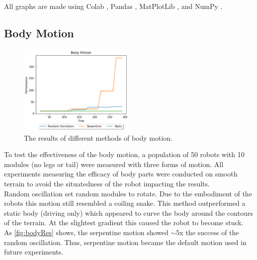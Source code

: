 \documentclass{article}
\begin{document}
All graphs are made using Colab \citep{colab}, Pandas \citep{pd}, MatPlotLib \citep{plt}, and NumPy \citep{np}.

\subsection{Body Motion}
\label{sec:Body Res}
\begin{figure}
    \centering
    \vspace*{-5mm}
    \includegraphics[width=0.5\textwidth]{bodyResults}
    \vspace*{-7mm}
    \caption{The results of different methods of body motion.}
    \label{fig:bodyRes}
\end{figure}
To test the effectiveness of the body motion, a population of 50 robots with 10 modules (no legs or tail) were measured with three forms of motion. All experiments measuring the efficacy of body parts were conducted on smooth terrain to avoid the situatedness of the robot impacting the results.\\
Random oscillation set random modules to rotate. Due to the embodiment of the robots this motion still resembled a coiling snake. This method outperformed a static body (driving only) which appeared to curve the body around the contours of the terrain. At the slightest gradient this caused the robot to become stuck. \\
As \autoref{fig:bodyRes} shows, the serpentine motion showed $\sim$5x the success of the random oscillation. Thus, serpentine motion became the default motion used in future experiments. 
\end{document}
